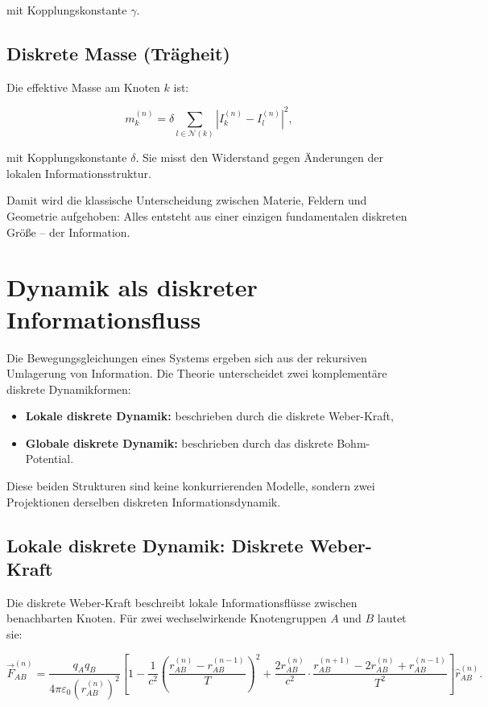 mit Kopplungskonstante \( \gamma \).

\subsection{Diskrete Masse (Trägheit)}
\label{sub:diskrete_masse}

Die effektive Masse am Knoten \( k \) ist:

\[
m_k^{(n)} = \delta \sum_{l \in \mathcal{N}(k)} \left| I_k^{(n)} - I_l^{(n)} \right|^2,
\]

mit Kopplungskonstante \( \delta \). Sie misst den Widerstand gegen Änderungen der lokalen Informationsstruktur.

Damit wird die klassische Unterscheidung zwischen Materie, Feldern und Geometrie aufgehoben: Alles entsteht aus einer einzigen fundamentalen diskreten Größe – der Information.

\section{Dynamik als diskreter Informationsfluss}
\label{sec:dynamik_als_informationsfluss}

Die Bewegungsgleichungen eines Systems ergeben sich aus der rekursiven Umlagerung von Information. Die Theorie unterscheidet zwei komplementäre diskrete Dynamikformen:

\begin{itemize}
    \item \textbf{Lokale diskrete Dynamik:} beschrieben durch die diskrete Weber-Kraft,
    \item \textbf{Globale diskrete Dynamik:} beschrieben durch das diskrete Bohm-Potential.
\end{itemize}

Diese beiden Strukturen sind keine konkurrierenden Modelle, sondern zwei Projektionen derselben diskreten Informationsdynamik.

\subsection{Lokale diskrete Dynamik: Diskrete Weber-Kraft}
\label{sub:diskrete_weber_kraft}

Die diskrete Weber-Kraft beschreibt lokale Informationsflüsse zwischen benachbarten Knoten. Für zwei wechselwirkende Knotengruppen \( A \) und \( B \) lautet sie:

\[
\vec{F}_{AB}^{(n)} = \frac{q_A q_B}{4\pi\varepsilon_0 (r_{AB}^{(n)})^2} \left[ 1 - \frac{1}{c^2} \left( \frac{r_{AB}^{(n)} - r_{AB}^{(n-1)}}{T} \right)^2 + \frac{2 r_{AB}^{(n)}}{c^2} \cdot \frac{r_{AB}^{(n+1)} - 2r_{AB}^{(n)} + r_{AB}^{(n-1)}}{T^2} \right] \hat{r}_{AB}^{(n)}.
\]

